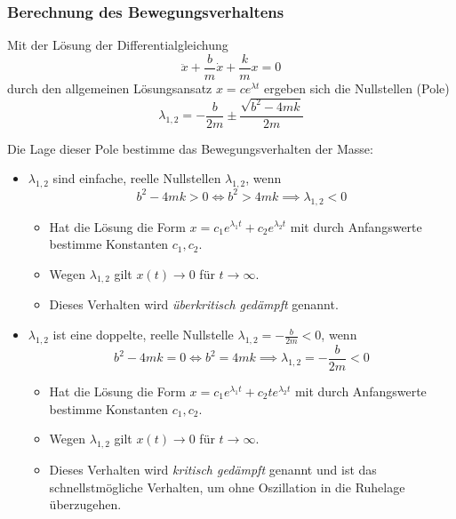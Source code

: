 \documentclass[a4paper, 11pt, accentcolor = tud3b]{tudreport}
\begin{document}
				\subsubsection{Berechnung des Bewegungsverhaltens} %
					\label{sec:bewegung}
				
					Mit der Lösung der Differentialgleichung \[ \ddot{x} + \frac{b}{m} \dot{x} + \frac{k}{m} x = 0 \] durch den allgemeinen Lösungsansatz \( x = ce^{\lambda t} \) ergeben sich die Nullstellen (Pole) \[ \lambda _ { 1, 2 } = - \frac{b}{2m} \pm \frac{\sqrt{b^2 - 4mk}}{2m} \]
					
					Die Lage dieser Pole bestimme das Bewegungsverhalten der Masse:
					\begin{itemize}
						\item \( \lambda _ { 1, 2 } \) sind einfache, reelle Nullstellen \( \lambda _ { 1, 2 } \), wenn
							\begin{equation*}
								b ^ 2 - 4mk > 0 \iff b ^ 2 > 4mk \implies \lambda _ { 1, 2 } < 0
							\end{equation*}
							\begin{itemize}
								\item Hat die Lösung die Form \( x = c_1 e^{\lambda_1 t} + c_2 e^{\lambda_2 t} \) mit durch Anfangswerte bestimme Konstanten \( c _ 1, c _ 2 \).
								\item Wegen \( \lambda _ { 1, 2 } \) gilt \( x(t) \rightarrow 0 \) für \( t \rightarrow \infty \).
								\item Dieses Verhalten wird \textit{überkritisch gedämpft} genannt.
							\end{itemize}
						\item \( \lambda _ { 1, 2 } \) ist eine doppelte, reelle Nullstelle \( \lambda_{1,2} = -\frac{b}{2m} < 0 \), wenn
							\begin{equation*}
								b^2 - 4mk = 0 \iff b^2 = 4mk \implies \lambda _ { 1, 2 } = -\frac{b}{2m} < 0
							\end{equation*}
							\begin{itemize}
								\item Hat die Lösung die Form \( x = c_1 e^{\lambda_1 t} + c_2 t e^{\lambda_2 t} \) mit durch Anfangswerte bestimme Konstanten \( c _ 1, c _ 2 \).
								\item Wegen \( \lambda _ { 1, 2 } \) gilt \( x(t) \rightarrow 0 \) für \( t \rightarrow \infty \).
								\item Dieses Verhalten wird \textit{kritisch gedämpft} genannt und ist das schnellstmögliche Verhalten, um ohne Oszillation in die Ruhelage überzugehen.

\end{itemize}
\end{itemize}
\end{document}
